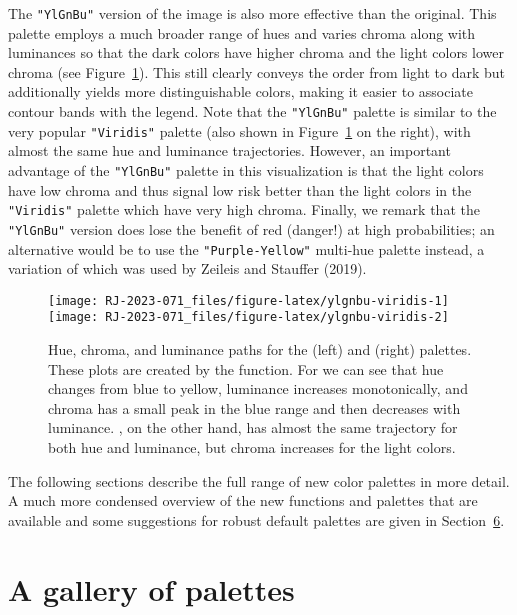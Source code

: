The \texttt{"YlGnBu"} version of the image is also more effective than
the original. This palette employs a much broader range of hues and varies
chroma along with luminances so that the dark colors have higher chroma and
the light colors lower chroma
(see Figure~\ref{fig:ylgnbu-viridis}). This still clearly conveys
the order from light to dark but additionally yields more distinguishable
colors, making it easier to associate contour bands with the legend.
Note that the \texttt{"YlGnBu"} palette is similar to the very popular
\texttt{"Viridis"} palette (also shown in Figure~\ref{fig:ylgnbu-viridis}
on the right), with almost the same hue and luminance trajectories.
However, an important advantage of the \texttt{"YlGnBu"} palette in this
visualization is that the light colors have low chroma and thus signal
low risk better than the light colors in the \texttt{"Viridis"} palette which
have very high chroma. Finally, we remark that the \texttt{"YlGnBu"} version
does lose the benefit of red (danger!) at high probabilities;
an alternative would be to use the \texttt{"Purple-Yellow"} multi-hue palette
instead, a variation of which was used by Zeileis and Stauffer (2019).

\begin{figure}[t!]

{\centering \texttt{[image: RJ-2023-071\_files/figure-latex/ylgnbu-viridis-1]} \texttt{[image: RJ-2023-071\_files/figure-latex/ylgnbu-viridis-2]} 

}

\caption{Hue, chroma, and luminance paths for the  (left) and  (right) palettes. These plots are created by the  function. For  we can see that hue changes from blue to yellow, luminance increases monotonically, and chroma has a small peak in the blue range and then decreases with luminance. , on the other hand, has almost the same trajectory for both hue and luminance, but chroma increases for the light colors.}\label{fig:ylgnbu-viridis}
\end{figure}

The following sections describe the full range of
new color palettes in more detail. A much more condensed
overview of the new functions and palettes that are available and
some suggestions for robust default palettes are given in
Section~\protect\hyperlink{sec:summary}{6}.

\hypertarget{a-gallery-of-palettes}{%
\section{A gallery of palettes}\label{a-gallery-of-palettes}}

